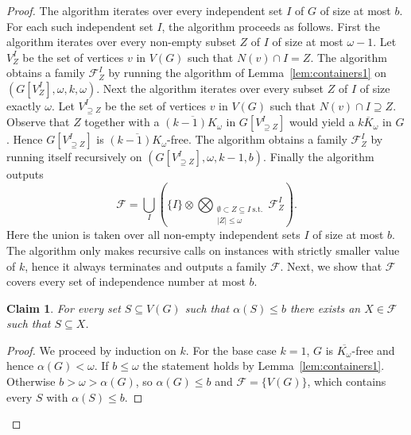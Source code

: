 \documentclass[11pt]{amsart}
\newtheorem{claim}{Claim}[theorem]
\newcommand{\cal}{\mathcal}
\newcounter{tbox}
\newcommand{\sta}[1]{\vspace*{0.3cm}\refstepcounter{tbox}\noindent{ \parbox{\textwidth}{(\thetbox) \emph{#1}}}\vspace*{0.3cm}}
\begin{document}
\begin{proof}
The algorithm iterates over every independent set $I$ of $G$ of size at most $b$. For each such independent set $I$, the algorithm proceeds as follows.
%
First the algorithm iterates over every non-empty subset $Z$ of $I$ of size at most $\omega-1$. 
%
Let $V_Z^I$ be the set of vertices $v$ in $V(G)$ such that $N(v) \cap I = Z$. The algorithm obtains a family ${\cal F}_Z^I$ by running the algorithm of Lemma~\ref{lem:containers1} on $(G[V_Z^I], \omega, k, \omega)$.
%
Next the algorithm iterates over every subset $Z$ of $I$ of size exactly $\omega$. Let $V_{\supseteq Z}^I$ be the set of vertices $v$ in $V(G)$ such that $N(v) \cap I \supseteq Z$.
%
Observe that $Z$ together with a $\overline{(k-1)K_\omega}$ in $G[V_{\supseteq Z}^I]$ would yield a $\overline{kK_\omega}$ in $G$. Hence $G[V_{\supseteq Z}^I]$ is $\overline{(k-1)K_\omega}$-free.
The algorithm obtains a family ${\cal F}_Z^I$ by running itself recursively on $(G[V_{\supseteq Z}^I], \omega, k-1, b)$.
%
Finally the algorithm outputs
$${\cal F} = \bigcup_{I}\left(\{I\} \otimes \bigotimes_{\substack{\emptyset \subset Z \subseteq I ~\text{s.t.} \\ |Z| \leq \omega}} {\cal F}_Z^I \right).$$
Here the union is taken over all non-empty independent sets $I$ of size at most $b$. The algorithm only makes recursive calls on instances with strictly smaller value of $k$, hence it always terminates and outputs a family ${\cal F}$. Next, we show that ${\cal F}$ covers every set of independence number at most $b$.
\begin{claim}\label{clm:family_covers2}
For every set $S \subseteq V(G)$ such that $\alpha(S) \leq b$ there exists an $X \in {\cal F}$ such that $S \subseteq X$.
\end{claim}

\begin{proof}
We proceed by induction on $k$. 
For the base case $k = 1$, $G$ is $\overline{K_\omega}$-free and hence $\alpha(G) < \omega$. If $b \leq \omega$
the statement holds by Lemma~\ref{lem:containers1}. Otherwise $b > \omega > \alpha(G)$, so $\alpha(G) \leq b$
and $\mathcal{F} = \{V(G)\}$, which contains every $S$ with $\alpha(S) \leq b$.


\end{proof}
\end{proof}
\end{document}
